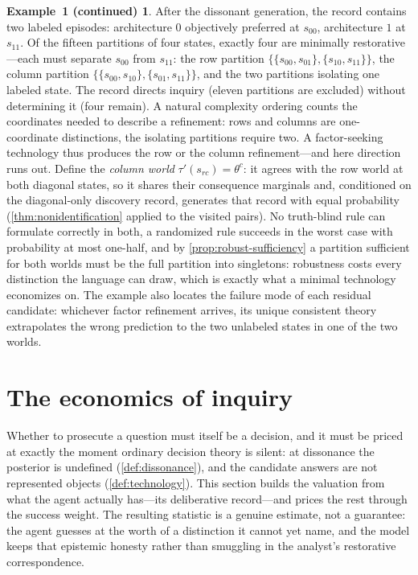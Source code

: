 \documentclass[11pt]{article}
\theoremstyle{definition}
\newtheorem*{excont}{Example~1 (continued)}
\begin{document}
\begin{excont}
After the dissonant generation, the record contains two labeled episodes:
architecture $0$ objectively preferred at $s_{00}$, architecture $1$ at
$s_{11}$.  Of the fifteen partitions of four states, exactly four are
minimally restorative---each must separate $s_{00}$ from $s_{11}$: the row
partition $\{\{s_{00},s_{01}\},\{s_{10},s_{11}\}\}$, the column partition
$\{\{s_{00},s_{10}\},\{s_{01},s_{11}\}\}$, and the two partitions isolating
one labeled state.  The record directs inquiry (eleven partitions are
excluded) without determining it (four remain).  A natural complexity
ordering counts the coordinates needed to describe a refinement: rows and
columns are one-coordinate distinctions, the isolating partitions require
two.  A factor-seeking technology thus produces the row or the column
refinement---and here direction runs out.  Define the \emph{column world}
$\tau'(s_{rc})=\theta^{c}$: it agrees with the row world at both diagonal
states, so it shares their consequence marginals and, conditioned on the
diagonal-only discovery record, generates that record with equal probability
(\cref{thm:nonidentification} applied to the visited pairs).  No truth-blind
rule can
formulate correctly in both, a randomized rule succeeds in the worst case
with probability at most one-half, and by \cref{prop:robust-sufficiency} a
partition sufficient for both worlds must be the full partition into
singletons: robustness costs every distinction the language can draw, which
is exactly what a minimal technology economizes on.  The example also
locates the failure mode of each residual candidate: whichever factor
refinement arrives, its unique consistent theory extrapolates the wrong
prediction to the two unlabeled states in one of the two worlds.
\end{excont}
\section{The economics of inquiry}
\label{sec:economics}

Whether to prosecute a question must itself be a decision, and it must be
priced at exactly the moment ordinary decision theory is silent: at
dissonance the posterior is undefined (\cref{def:dissonance}), and the
candidate answers are not represented objects (\cref{def:technology}).  This
section builds the valuation from what the agent actually has---its
deliberative record---and prices the rest through the success weight.  The
resulting statistic is a genuine estimate, not a guarantee: the agent guesses
at the worth of a distinction it cannot yet name, and the model keeps that
epistemic honesty rather than smuggling in the analyst's restorative
correspondence.
\end{document}
